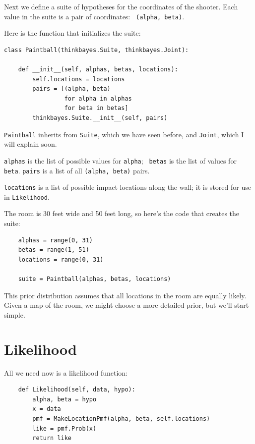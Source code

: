 \documentclass[12pt]{book}
\begin{document}
Next we define a suite of hypotheses for the coordinates of the
shooter.  Each value in the suite is a pair of coordinates: {\tt
  (alpha, beta)}.

Here is the function that initializes the suite:

\begin{verbatim}
class Paintball(thinkbayes.Suite, thinkbayes.Joint):

    def __init__(self, alphas, betas, locations):
        self.locations = locations
        pairs = [(alpha, beta) 
                 for alpha in alphas 
                 for beta in betas]
        thinkbayes.Suite.__init__(self, pairs)
\end{verbatim}

{\tt Paintball} inherits from {\tt Suite}, which we have seen before,
and {\tt Joint}, which I will explain soon.

{\tt alphas} is the list of possible values for {\tt alpha}; {\tt
  betas} is the list of values for {\tt beta}.  {\tt pairs} is a list
of all {\tt (alpha, beta)} pairs.

{\tt locations} is a list of possible impact locations along
the wall; it is stored for use in {\tt Likelihood}.

The room is 30 feet wide and 50 feet long, so here's the code that
creates the suite:

\begin{verbatim}
    alphas = range(0, 31)
    betas = range(1, 51)
    locations = range(0, 31)

    suite = Paintball(alphas, betas, locations)
\end{verbatim}

This prior distribution assumes that all locations in the room are
equally likely.  Given a map of the room, we might choose a more
detailed prior, but we'll start simple.


\section{Likelihood}

All we need now is a likelihood function:

\begin{verbatim}
    def Likelihood(self, data, hypo):
        alpha, beta = hypo
        x = data
        pmf = MakeLocationPmf(alpha, beta, self.locations)
        like = pmf.Prob(x)
        return like
\end{verbatim}
\end{document}

